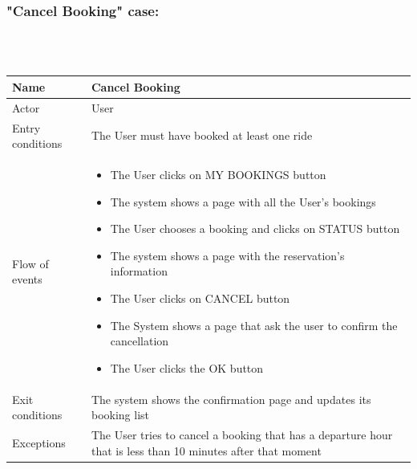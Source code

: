 \subsubsection{"Cancel Booking" case:}
\hfill \\
\\
\begin{tabular}{|p{3cm}|p{10cm}|}
\hline
Name & Cancel Booking\\
\hline
Actor & User\\
\hline
Entry conditions & The User must have booked at least one ride\\
\hline
Flow of events &
	\begin{itemize}
		\item The User clicks on MY BOOKINGS button
		\item The system shows a page with all the User's bookings
		\item The User chooses a booking and clicks on STATUS button				
		\item The system shows a page with the reservation's information
		\item The User clicks on CANCEL button
		\item The System shows a page that ask the user to confirm the cancellation
		\item The User clicks the OK button
	\end{itemize}\\
\hline
Exit conditions & The system shows the confirmation page and updates its booking list\\
\hline
Exceptions & The User tries to cancel a booking that has a departure hour that is less than 10 minutes after that moment\\
\hline
\end {tabular}


\newpage

